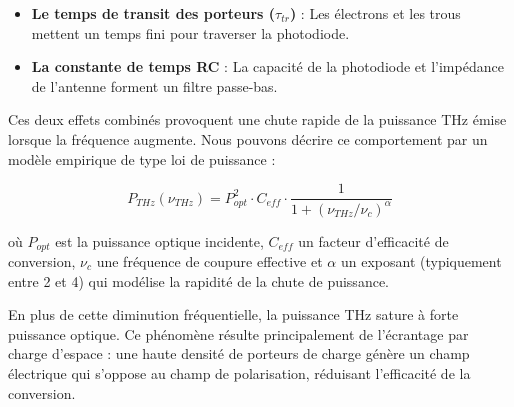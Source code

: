 \begin{itemize}
    \item \textbf{Le temps de transit des porteurs ($\tau_{tr}$)} : Les électrons et les trous mettent un temps fini pour traverser la photodiode.
    \item \textbf{La constante de temps RC} : La capacité de la photodiode et l'impédance de l'antenne forment un filtre passe-bas.
\end{itemize}

Ces deux effets combinés provoquent une chute rapide de la puissance THz émise lorsque la fréquence augmente. Nous pouvons décrire ce comportement par un modèle empirique de type loi de puissance :

\begin{equation}
P_{THz}(\nu_{THz}) = P_{opt}^2 \cdot C_{eff} \cdot \frac{1}{1 + (\nu_{THz}/\nu_{c})^\alpha}
\label{eq:power_roll_off}
\end{equation}

où $P_{opt}$ est la puissance optique incidente, $C_{eff}$ un facteur d'efficacité de conversion, $\nu_{c}$ une fréquence de coupure effective et $\alpha$ un exposant (typiquement entre 2 et 4) qui modélise la rapidité de la chute de puissance.

En plus de cette diminution fréquentielle, la puissance THz sature à forte puissance optique. Ce phénomène résulte principalement de l'écrantage par charge d'espace : une haute densité de porteurs de charge génère un champ électrique qui s'oppose au champ de polarisation, réduisant l'efficacité de la conversion.



